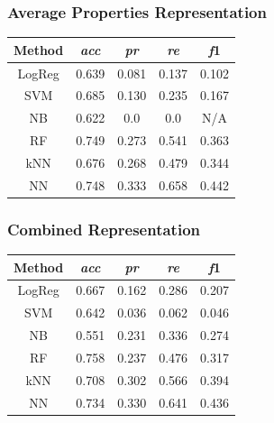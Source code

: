 \documentclass[10pt,twocolumn,letterpaper]{article}
\begin{document}
\subsubsection{Average Properties Representation}
\begin{center}
\begin{tabular}{|c|c|c|c|c|}
    \hline
    \textbf{Method} & \textbf{\textit{acc}} & \textbf{\textit{pr}} & \textbf{\textit{re}} & \textbf{\textit{f}1} \\
    \hline
    LogReg & 0.639 & 0.081 & 0.137 & 0.102 \\
    \hline
    SVM & 0.685 & 0.130 & 0.235 & 0.167 \\
    \hline
    NB & 0.622 & 0.0 & 0.0 & N/A \\
    \hline
    RF & 0.749 & 0.273 & 0.541 & 0.363 \\
    \hline
    kNN & 0.676 & 0.268 & 0.479 & 0.344 \\
    \hline
    NN & 0.748 & 0.333 & 0.658 & 0.442 \\
    \hline
\end{tabular}
\end{center}

\subsubsection{Combined Representation}
\begin{center}
\begin{tabular}{|c|c|c|c|c|}
    \hline
    \textbf{Method} & \textbf{\textit{acc}} & \textbf{\textit{pr}} & \textbf{\textit{re}} & \textbf{\textit{f}1} \\
    \hline
    LogReg & 0.667 & 0.162 & 0.286 & 0.207 \\
    \hline
    SVM & 0.642 & 0.036 & 0.062 & 0.046 \\
    \hline
    NB & 0.551 & 0.231 & 0.336 & 0.274 \\
    \hline
    RF & 0.758 & 0.237 & 0.476 & 0.317 \\
    \hline
    kNN & 0.708 & 0.302 & 0.566 & 0.394 \\
    \hline
    NN & 0.734 & 0.330 & 0.641 & 0.436 \\
    \hline
\end{tabular}    
\end{center}
\end{document}
